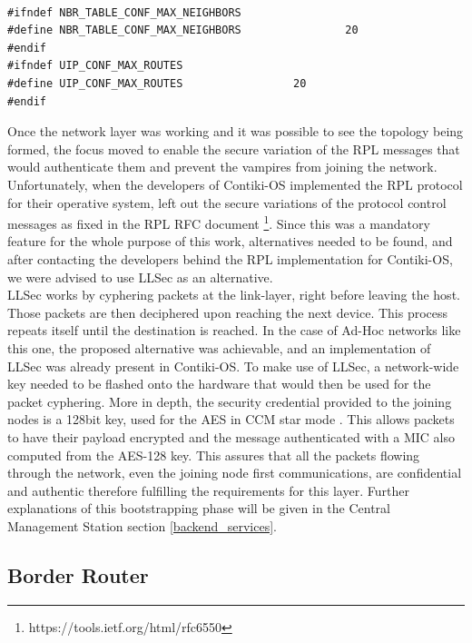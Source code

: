 \begin{lstlisting}[caption={RPL Configurations}]

#ifndef NBR_TABLE_CONF_MAX_NEIGHBORS
#define NBR_TABLE_CONF_MAX_NEIGHBORS                20
#endif
#ifndef UIP_CONF_MAX_ROUTES
#define UIP_CONF_MAX_ROUTES                 20
#endif

\end{lstlisting}

Once the network layer was working and it was possible to see the topology being formed, the focus moved to enable the secure variation of the \gls{RPL} messages that would authenticate them and prevent the vampires from joining the network. Unfortunately, when the developers of Contiki-OS implemented the \gls{RPL} protocol for their operative system, left out the secure variations of the protocol control messages as fixed in the \gls{RPL} RFC document \footnote{https://tools.ietf.org/html/rfc6550}. Since this was a mandatory feature for the whole purpose of this work, alternatives needed to be found, and after contacting the developers behind the \gls{RPL} implementation for Contiki-OS, we were advised to use \gls{LLSec} as an alternative.\\
\gls{LLSec} works by cyphering packets at the link-layer, right before leaving the host. Those packets are then deciphered upon reaching the next device. This process repeats itself until the destination is reached. In the case of Ad-Hoc networks like this one, the proposed alternative was achievable, and an implementation of \gls{LLSec} was already present in Contiki-OS. To make use of \gls{LLSec}, a network-wide key needed to be flashed onto the hardware that would then be used for the packet cyphering. More in depth, the security credential provided to the joining nodes is a 128bit key, used for the \gls{AES} \cite{Fips2001} in \gls{CCM} star mode \cite{Corp2005}. This allows packets to have their payload encrypted and the message authenticated with a \gls{MIC} also computed from the AES-128 key. This assures that all the packets flowing through the network, even the joining node first communications, are confidential and authentic therefore fulfilling the requirements for this layer. Further explanations of this bootstrapping phase will be given in the Central Management Station section \ref{backend_services}.

\subsection{Border Router}

